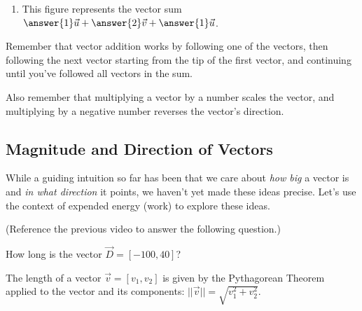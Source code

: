 \documentclass{ximera}
\begin{document}
\begin{problem}
\begin{enumerate}
        \item 
        
        This figure represents the vector sum $\answer{1}\vec{u}+\answer{2}\vec{v}+\answer{1}\vec{u}$.
    \end{enumerate}
    
    \begin{feedback}
        Remember that vector addition works by following one of the vectors, then following the next vector starting from the tip of the first vector, and continuing until you've followed all vectors in the sum. 

        Also remember that multiplying a vector by a number scales the vector, and multiplying by a negative number reverses the vector's direction.
    \end{feedback}
\end{problem}


\subsection*{Magnitude and Direction of Vectors}

While a guiding intuition so far has been that we care about \emph{how big} a vector is and \emph{in what direction} it points, we haven't yet made these ideas precise. Let's use the context of expended energy (work) to explore these ideas.


\begin{problem}
    (Reference the previous video to answer the following question.)
    
    How long is the vector $\vec{D}=[-100,40]$? 

    \begin{selectAll}
    \end{selectAll}
    \begin{feedback}
        The length of a vector $\vec{v}=[v_1,v_2]$ is given by the Pythagorean Theorem applied to the vector and its components: $||\vec{v}||=\sqrt{v_1^2+v_2^2}$.
    \end{feedback}
\end{problem}
\end{document}
